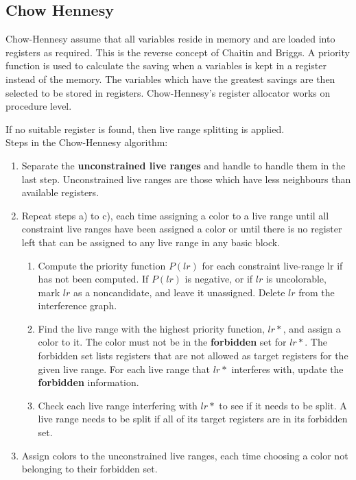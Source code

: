 \documentclass[a4paper,10pt]{article}
\begin{document}
\subsection{Chow Hennesy}
Chow-Hennesy assume that all variables reside in memory and are loaded into registers as required. This is the reverse concept of
Chaitin and Briggs. A priority function is used to calculate the saving when a variables is kept in a register
instead of the memory. The variables which have the greatest savings are then selected to be stored in registers. Chow-Hennesy's
register allocator works on procedure level.

If no suitable register is found, then live range splitting is applied.\\

Steps in the Chow-Hennesy algorithm:
\begin{enumerate}
 \item Separate the \textbf{unconstrained live ranges} and handle to handle them in the last step. Unconstrained live ranges are those
       which have less neighbours than available registers.
 \item Repeat steps a) to c), each time assigning a color to a live range until all constraint live ranges have been assigned a color or
       until there is no register left that can be assigned to any live range in any basic block.
 \begin{enumerate}
  \item Compute the priority function $P(lr)$ for each constraint live-range lr if has not been computed. If $P(lr)$ is negative, or if
        $lr$ is uncolorable, mark $lr$ as a noncandidate, and leave it unassigned. Delete $lr$ from the interference graph.
  \item Find the live range with the highest priority function, $lr*$, and assign a color to it. The color must not be in the
        \textbf{forbidden} set for $lr*$. The forbidden set lists registers that are not allowed as target registers for the given live
        range. For each live range that $lr*$ interferes with, update the \textbf{forbidden} information.
  \item Check each live range interfering with $lr*$ to see if it needs to be split. A live range needs to be split if all of its target
        registers are in its forbidden set.
 \end{enumerate}
 \item Assign colors to the unconstrained live ranges, each time choosing a color not belonging to their forbidden set.
\end{enumerate}
\end{document}
